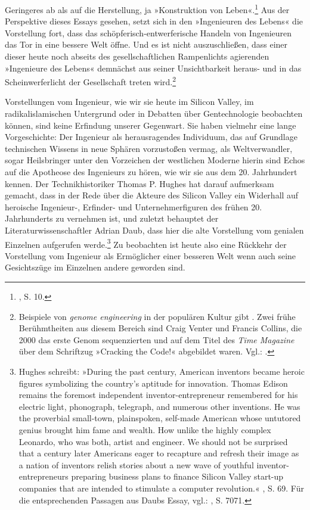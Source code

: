 \documentclass[%
	fontsize=10pt,%
	twoside,%
	headings=optiontoheadandtoc,%
	showtrims]{scrbook}
\begin{document}
Geringeres ab als auf die Herstellung, ja »Konstruktion von Leben«.\footnote{\cite[][]{satw2011a}, S. 10.}  Aus der Perspektive dieses Essays gesehen, setzt sich in den »Ingenieuren des Lebens« die Vorstellung fort, dass das schöpferisch-entwerferische Handeln von Ingenieuren das Tor in eine bessere Welt öffne. Und es ist nicht auszuschließen, dass einer dieser heute noch abseits des gesellschaftlichen Rampenlichts agierenden »Ingenieure des Lebens« demnächst aus seiner Unsichtbarkeit heraus- und in das Scheinwerferlicht der Gesellschaft treten wird.\footnote{Beispiele von \emph{genome engineering} in der populären Kultur gibt \cite[][]{rallapalli2020a}. Zwei frühe Berühmtheiten aus diesem Bereich sind Craig Venter und Francis Collins, die 2000 das erste Genom sequenzierten und auf dem Titel des \emph{Time Magazine} über dem Schriftzug »Cracking the Code!« abgebildet waren. Vgl.: \cite[][]{ov2000a}.} \par Vorstellungen vom Ingenieur, wie wir sie heute im Silicon Valley, im radikalislamischen Untergrund oder in Debatten über Gentechnologie beobachten können, sind keine Erfindung unserer Gegenwart. Sie haben vielmehr eine lange Vorgeschichte: Der Ingenieur als herausragendes Individuum, das auf Grundlage technischen Wissens in neue Sphären vorzustoßen vermag, als Weltverwandler, sogar Heilsbringer unter den Vorzeichen der westlichen Moderne \textendash{} hierin sind Echos auf die Apotheose des Ingenieurs zu hören, wie wir sie aus dem 20. Jahrhundert kennen. Der Technikhistoriker Thomas P. Hughes hat darauf aufmerksam gemacht, dass in der Rede über die Akteure des Silicon Valley ein Widerhall auf heroische Ingenieur-, Erfinder- und Unternehmerfiguren des frühen 20. Jahrhunderts zu vernehmen ist, und zuletzt behauptet der Literaturwissenschaftler Adrian Daub, dass hier die alte Vorstellung vom genialen Einzelnen aufgerufen werde.\footnote{Hughes schreibt: »During the past century, American inventors became heroic figures symbolizing the country\textquoteright{}s aptitude for innovation. Thomas Edison remains the foremost independent inventor-entrepreneur remembered for his electric light, phonograph, telegraph, and numerous other inventions. He was the proverbial small-town, plainspoken, self-made American whose untutored genius brought him fame and wealth. How unlike the highly complex Leonardo, who was both, artist and engineer. We should not be surprised that a century later Americans eager to recapture and refresh their image as a nation of inventors relish stories about a new wave of youthful inventor-entrepreneurs preparing business plans to finance Silicon Valley start-up companies that are intended to stimulate a computer revolution.« \cite[][]{hughes2004a}, S. 69. Für die entsprechenden Passagen aus Daubs Essay, vgl.: \cite[][]{daub2020a}, S. 70\textendash{}71.}  Zu beobachten ist heute also eine Rückkehr der Vorstellung vom Ingenieur als Ermöglicher einer besseren Welt \textendash{} wenn auch seine Gesichtszüge im Einzelnen andere geworden sind.
\end{document}
